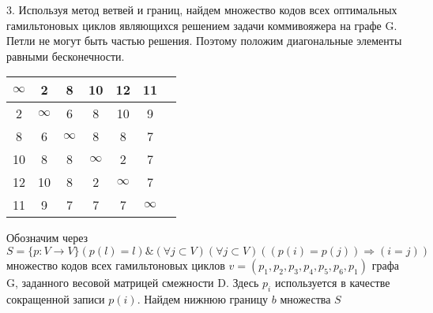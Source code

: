 \documentclass[a4paper,10pt]{report} %
\begin{document}
\smallskip

3. \quad Используя метод ветвей и границ, найдем множество кодов всех оптимальных гамильтоновых
 циклов являющихся решением задачи коммивояжера на графе G.
Петли не могут быть частью решения. Поэтому положим диагональные элементы равными бесконечности.

\begin{flushleft}\begin{tabular}[]{|c|c|c|c|c|c|c|}
\hline
$\infty$&      2 &      8 &      10 &      12 &      11\\
\hline
      2 & $\infty$ &      6 &      8 &      10 &      9\\
\hline
      8 &      6 & $\infty$ &      8 &      8 &      7\\
\hline
      10 &      8 &      8 & $\infty$ &      2 &      7\\
\hline
      12 &      10 &      8 &      2 & $\infty$ &      7\\
\hline
      11 &      9 &      7 &      7 &      7 & $\infty$\\
\hline
\end{tabular}
\end{flushleft}

Обозначим через
$ S = \{ p:V \rightarrow V \} (p(l) = l) \& ( \forall j \subset V ) ( \forall j \subset V) ((p(i) = p(j)) \Longrightarrow (i = j))$
множество кодов всех гамильтоновых циклов $v=(p_1,p_2,p_3,p_4,p_5,p_6,p_1)$ графа G, 
заданного весовой матрицей смежности D. 
Здесь $p_{i}$ используется в качестве сокращенной записи $p(i)$.
Найдем нижнюю границу $b$ множества $S$


\captionsetup{justification=raggedright,
singlelinecheck=false
}

\captionsetup[subfloat]{labelformat=empty}
\end{document}
